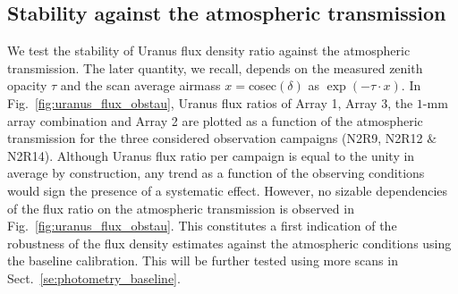 \subsection{Stability against the atmospheric transmission}
\label{se:baseline_calibration_atm}

We test the stability of Uranus flux density ratio
against the atmospheric transmission. The later quantity, we
recall, depends on the measured zenith opacity $\tau$ and the scan
average airmass $x = $cosec$(\delta)$ as $\exp{(-\tau \cdot x)}$. In
Fig.~\ref{fig:uranus_flux_obstau}, Uranus flux ratios of Array 1,
Array 3, the $1$-mm array combination and Array 2 are plotted as a
function of the atmospheric transmission for the three considered
observation campaigns (N2R9, N2R12 $\&$ N2R14). Although Uranus flux
ratio per campaign is equal to the unity in average by construction, any trend as
a function of the observing conditions would sign the presence of a
systematic effect. However, no sizable dependencies of the flux ratio
on the atmospheric transmission is observed in Fig.~\ref{fig:uranus_flux_obstau}. This constitutes a first
indication of the robustness of the flux density estimates against the
atmospheric conditions using the baseline calibration. This will be
further tested using more scans in Sect.~\ref{se:photometry_baseline}.   


